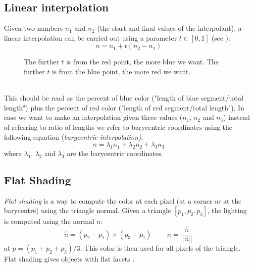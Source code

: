\subsection{Linear interpolation}\label{section:linear-interpolation}
Given two numbers $n_1$ and $n_2$ (the start and final values of the interpolant), a linear interpolation can be carried out using a parameter $t\in[0,1]$ (see \cite{WEBSITE:interpolation}):
$$ n = n_1 + t (n_2 - n_1)$$
\begin{figure}[!h]
  \centering
  \caption{The further $t$ is from the red point, the more blue we want. The further $t$ is from the blue point, the more red we want.} %
\end{figure}
\\
This should be read as the percent of blue color ("length of blue segment/total length") plus the percent of red color ("length of red segment/total length"). In case we want to make an interpolation given three values ($n_1$, $n_2$ and $n_3$) instead of referring to ratio of lengths we refer to barycentric coordinates using the following equation (\textit{barycentric interpolation)}:
$$ n = \lambda_1n_1 + \lambda_2n_2 + \lambda_3n_3$$
where $\lambda_1$, $\lambda_2$ and $\lambda_3$ are the barycentric coordinates.


\subsection{Flat Shading}
\textit{Flat shading} is a way to compute the color at each pixel (at a corner or at the barycentre) using the triangle normal.
Given a triangle $[p_1, p_2, p_3]$, the lighting is computed using the normal $n$: $$\widehat{n} = (p_2 - p_1) \times (p_3 - p_1) \;\;\;\;\;\;\;\; n = \frac{ \widehat{n} } { ||\widehat{n}|| } $$ at $p= (p_1 + p_2 + p_3)/3$. This color is then used for all pixels of the triangle. Flat shading gives objects with flat facets \cite{SLIDE:ICORSI}.

